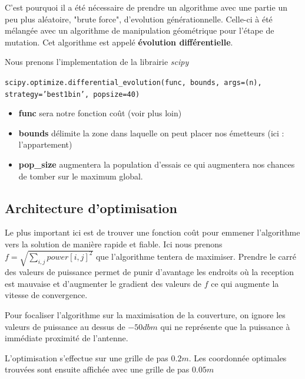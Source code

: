 \documentclass[sn-mathphys-num]{sn-jnl}%
\theoremstyle{thmstyleone}%
\theoremstyle{thmstyletwo}%
\theoremstyle{thmstylethree}%
\begin{document}
C'est pourquoi il a été nécessaire de prendre un algorithme avec une partie un peu
plus aléatoire, "brute force", d'evolution générationnelle. Celle-ci à été mélangée
avec un algorithme de manipulation géométrique pour l'étape de mutation. Cet algorithme
est appelé \textbf{évolution différentielle}.


Nous prenons l'implementation de la librairie \textit{scipy}

\texttt{scipy.optimize.differential\_evolution(func, bounds, args=(n), strategy='best1bin', popsize=40)}
\begin{itemize}
    \item \textbf{func} sera notre fonction coût (voir plus loin)
    \item \textbf{bounds} délimite la zone dans laquelle on peut placer nos émetteurs (ici : l'appartement) 
    \item \textbf{pop\_size} augmentera la population d'essais ce qui augmentera nos chances de tomber sur le maximum global.

\end{itemize}

\subsection{Architecture d'optimisation}

Le plus important ici est de trouver une fonction coût pour emmener l'algorithme
vers la solution de manière rapide et fiable.
Ici nous prenons $f = \sqrt{\sum_{i,j}power[i,j]^2}$ que l'algorithme tentera de maximiser.
Prendre le carré des valeurs de puissance permet de punir d'avantage les endroits où
la reception est mauvaise et d'augmenter le gradient des valeurs de $f$ ce qui 
augmente la vitesse de convergence. 

Pour focaliser l'algorithme sur la maximisation de la couverture,
on ignore les valeurs de puissance au dessus de $-50dbm$ qui ne représente que la puissance
à immédiate proximité de l'antenne.

L'optimisation s'effectue sur une grille de pas $0.2m$. Les coordonnée optimales
trouvées sont ensuite affichée avec une grille de pas $0.05m$
\end{document}
